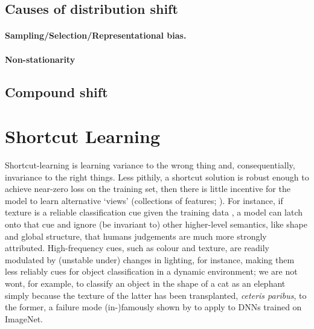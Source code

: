 \subsection{Causes of distribution shift}
\paragraph{Sampling/Selection/Representational bias.}
\citep{kallus2018residual}
\paragraph{Non-stationarity}

\subsection{Compound shift}

%
\section{Shortcut Learning}\label{shortcut-learning}

Shortcut-learning is learning variance to the wrong thing and, consequentially, invariance to the
right things.
%
Less pithily, a shortcut solution is robust enough to achieve near-zero loss on the training set,
then there is little incentive for the model to learn alternative `views' (collections of features;
\cite{allen2020towards}).
%
For instance, if texture is a reliable classification cue given the training data
\cite{geirhos2018imagenet}, a model can latch onto that cue and ignore (be invariant to) other
higher-level semantics, like shape and global structure, that humans judgements are much more
strongly attributed.
%
High-frequency cues, such as colour and texture, are readily modulated by (unstable under) changes
in lighting, for instance, making them less reliably cues for object classification in a dynamic
environment; we are not wont, for example, to classify an object in the shape of a cat as an
elephant simply because the texture of the latter has been transplanted, \emph{ceteris paribus}, to
the former, a failure mode (in-)famously shown by \cite{geirhos2018imagenet} to apply to DNNs
trained on ImageNet.

